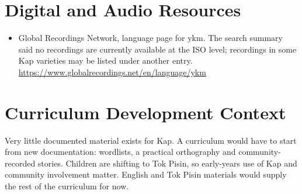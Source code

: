\documentclass[12pt]{article}
\begin{document}
\section{Digital and Audio Resources}
\begin{itemize}
\item Global Recordings Network, language page for ykm. The search summary said no recordings are currently available at the ISO level; recordings in some Kap varieties may be listed under another entry. \url{https://www.globalrecordings.net/en/language/ykm}
\end{itemize}

\section{Curriculum Development Context}
Very little documented material exists for Kap. A curriculum would have to start from new documentation: wordlists, a practical orthography and community-recorded stories. Children are shifting to Tok Pisin, so early-years use of Kap and community involvement matter. English and Tok Pisin materials would supply the rest of the curriculum for now.
\end{document}
